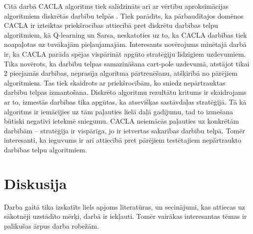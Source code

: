 \documentclass{ludis} %
\begin{document}
Citā darbā CACLA algoritms tiek salīdzināts arī ar vērtību aproksimācijas algoritmiem diskrētās darbību telpās \autocite{Hasselt2009}.
Tiek parādīts, ka pārbaudītajos domēnos CACLA ir izteiktas priekšrocības attiecībā pret diskrētu darbības telpu algoritmiem, kā Q-learning un Sarsa, neskatoties uz to, ka CACLA darbības tiek noapaļotas uz tuvākajām pieļaujamajām.
Interesants novērojums minētajā darbā ir, ka CACLA parāda spējas vispārināt apgūto stratēģiju līdzīgiem uzdevumiem.
Tika novērots, ka darbību telpas samazināšana cart-pole uzdevumā, atstājot tikai 2 pieejamās darbības, neprasīja algoritma pārtrenēšanu, atšķirībā no pārējiem algoritmiem.
Tas tiek skaidrots ar priekšrocībām, ko sniedz nepārtrauktas darbību telpas izmantošana.
Diskrēto algoritmu rezultātu kritums ir skaidrojams ar to, izmestās darbības tika apgūtas, ka atsevišķas sastāvdaļas stratēģijā.
Tā kā algoritms ir iemācījies uz tām paļauties lielā daļā gadījumu, tad to izmešana būtiski negatīvi ietekmē sniegumu.
CACLA neiemācās paļauties uz konkrētām darbībām -- stratēģija ir vispārīga, jo ir ietvertas sakarības darbību telpā.
Tomēr interesanti, ka ieguvums ir arī attiecībā pret pārējiem testētajiem nepārtraukto darbības telpu algoritmiem.

\chapter{Diskusija}
Darba gaitā tika izskatīts liels apjoms literatūras, un secinājumi, kas attiecas uz sākotnēji uzstādīto mērķi, %
darbā ir iekļauti.
Tomēr vairākas interesantas tēmas ir palikušas ārpus darba robežām.
\end{document}
